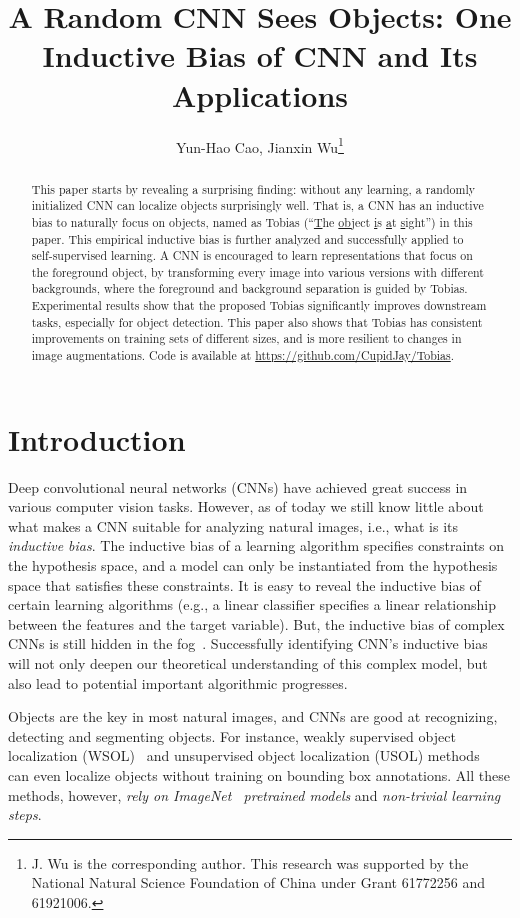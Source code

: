 \documentclass[letterpaper]{article} %
\title{A Random CNN Sees Objects: One Inductive Bias of CNN and Its Applications}
\author{
Yun-Hao Cao, Jianxin Wu\thanks{J. Wu is the corresponding author. This research was supported by the National Natural Science Foundation of China under Grant 61772256 and 61921006.}
}
\begin{document}
\maketitle

\begin{abstract}
	This paper starts by revealing a surprising finding: without any learning, a randomly initialized CNN can localize objects surprisingly well. That is, a CNN has an inductive bias to naturally focus on objects, named as Tobias (``\underline{T}he \underline{ob}ject \underline{i}s \underline{a}t \underline{s}ight'') in this paper. This empirical inductive bias is further analyzed and successfully applied to self-supervised learning. A CNN is encouraged to learn representations that focus on the foreground object, by transforming every image into various versions with different backgrounds, where the foreground and background separation is guided by Tobias. Experimental results show that the proposed Tobias significantly improves downstream tasks, especially for object detection. This paper also shows that Tobias has consistent improvements on training sets of different sizes, and is more resilient to changes in image augmentations. Code is available at \url{https://github.com/CupidJay/Tobias}.
\end{abstract}

\section{Introduction}

Deep convolutional neural networks (CNNs) have achieved great success in various computer vision tasks. However, as of today we still know little about what makes a CNN suitable for analyzing natural images, i.e., what is its \emph{inductive bias}. The inductive bias of a learning algorithm specifies constraints on the hypothesis space, and a model can only be instantiated from the hypothesis space that satisfies these constraints. It is easy to reveal the inductive bias of certain learning algorithms (e.g., a linear classifier specifies a linear relationship between the features and the target variable). But, the inductive bias of complex CNNs is still hidden in the fog~\citep{bias:cohen:ICLR17}. Successfully identifying CNN's inductive bias will not only deepen our theoretical understanding of this complex model, but also lead to potential important algorithmic progresses.

Objects are the key in most natural images, and CNNs are good at recognizing, detecting and segmenting objects. For instance, weakly supervised object localization (WSOL)~\citep{cam:zhou:CVPR16, gradcam:ICCV17, psol:zhang:CVPR20} and unsupervised object localization (USOL) methods~\citep{scda:tip17, ddt:wei:pr19} can even localize objects without training on bounding box annotations. All these methods, however, \textit{rely on ImageNet~\citep{ILSVRC2012:russakovsky:IJCV15} pretrained models} and \emph{non-trivial learning steps}.
\end{document}
